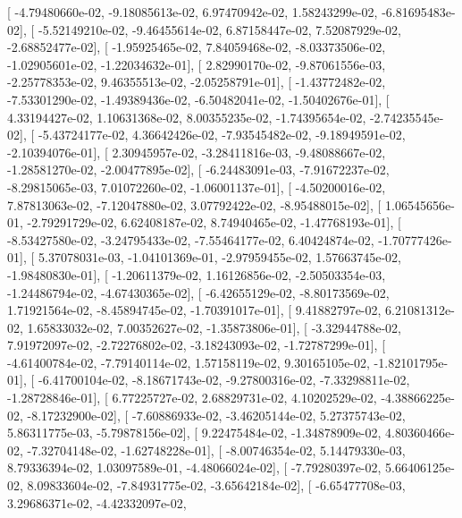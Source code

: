 \documentclass{article}
\begin{document}
       [ -4.79480660e-02,  -9.18085613e-02,   6.97470942e-02,
          1.58243299e-02,  -6.81695483e-02],
       [ -5.52149210e-02,  -9.46455614e-02,   6.87158447e-02,
          7.52087929e-02,  -2.68852477e-02],
       [ -1.95925465e-02,   7.84059468e-02,  -8.03373506e-02,
         -1.02905601e-02,  -1.22034632e-01],
       [  2.82990170e-02,  -9.87061556e-03,  -2.25778353e-02,
          9.46355513e-02,  -2.05258791e-01],
       [ -1.43772482e-02,  -7.53301290e-02,  -1.49389436e-02,
         -6.50482041e-02,  -1.50402676e-01],
       [  4.33194427e-02,   1.10631368e-02,   8.00355235e-02,
         -1.74395654e-02,  -2.74235545e-02],
       [ -5.43724177e-02,   4.36642426e-02,  -7.93545482e-02,
         -9.18949591e-02,  -2.10394076e-01],
       [  2.30945957e-02,  -3.28411816e-03,  -9.48088667e-02,
         -1.28581270e-02,  -2.00477895e-02],
       [ -6.24483091e-03,  -7.91672237e-02,  -8.29815065e-03,
          7.01072260e-02,  -1.06001137e-01],
       [ -4.50200016e-02,   7.87813063e-02,  -7.12047880e-02,
          3.07792422e-02,  -8.95488015e-02],
       [  1.06545656e-01,  -2.79291729e-02,   6.62408187e-02,
          8.74940465e-02,  -1.47768193e-01],
       [ -8.53427580e-02,  -3.24795433e-02,  -7.55464177e-02,
          6.40424874e-02,  -1.70777426e-01],
       [  5.37078031e-03,  -1.04101369e-01,  -2.97959455e-02,
          1.57663745e-02,  -1.98480830e-01],
       [ -1.20611379e-02,   1.16126856e-02,  -2.50503354e-03,
         -1.24486794e-02,  -4.67430365e-02],
       [ -6.42655129e-02,  -8.80173569e-02,   1.71921564e-02,
         -8.45894745e-02,  -1.70391017e-01],
       [  9.41882797e-02,   6.21081312e-02,   1.65833032e-02,
          7.00352627e-02,  -1.35873806e-01],
       [ -3.32944788e-02,   7.91972097e-02,  -2.72276802e-02,
         -3.18243093e-02,  -1.72787299e-01],
       [ -4.61400784e-02,  -7.79140114e-02,   1.57158119e-02,
          9.30165105e-02,  -1.82101795e-01],
       [ -6.41700104e-02,  -8.18671743e-02,  -9.27800316e-02,
         -7.33298811e-02,  -1.28728846e-01],
       [  6.77225727e-02,   2.68829731e-02,   4.10202529e-02,
         -4.38866225e-02,  -8.17232900e-02],
       [ -7.60886933e-02,  -3.46205144e-02,   5.27375743e-02,
          5.86311775e-03,  -5.79878156e-02],
       [  9.22475484e-02,  -1.34878909e-02,   4.80360466e-02,
         -7.32704148e-02,  -1.62748228e-01],
       [ -8.00746354e-02,   5.14479330e-03,   8.79336394e-02,
          1.03097589e-01,  -4.48066024e-02],
       [ -7.79280397e-02,   5.66406125e-02,   8.09833604e-02,
         -7.84931775e-02,  -3.65642184e-02],
       [ -6.65477708e-03,   3.29686371e-02,  -4.42332097e-02,
\end{document}
